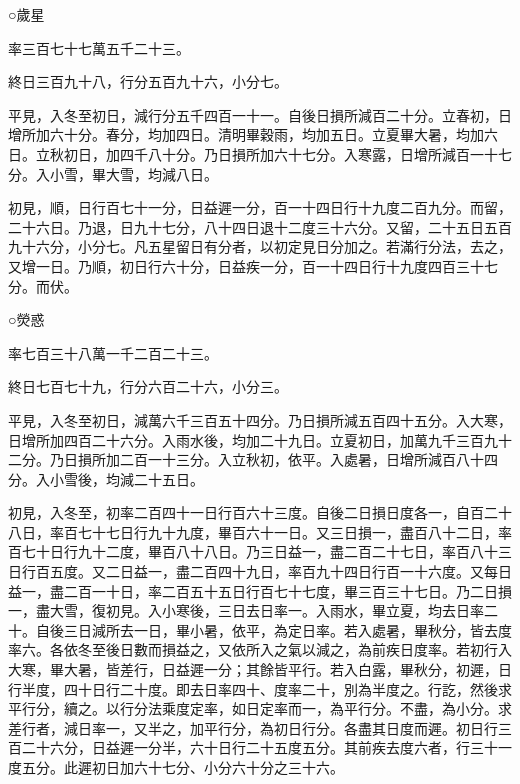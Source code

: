 \begin{pinyinscope}
 ○歲星



 率三百七十七萬五千二十三。



 終日三百九十八，行分五百九十六，小分七。



 平見，入冬至初日，減行分五千四百一十一。自後日損所減百二十分。立春初，日增所加六十分。春分，均加四日。清明畢穀雨，均加五日。立夏畢大暑，均加六日。立秋初日，加四千八十分。乃日損所加六十七分。入寒露，日增所減百一十七分。入小雪，畢大雪，均減八日。



 初見，順，日行百七十一分，日益遲一分，百一十四日行十九度二百九分。而留，二十六日。乃退，日九十七分，八十四日退十二度三十六分。又留，二十五日五百九十六分，小分七。凡五星留日有分者，以初定見日分加之。若滿行分法，去之，又增一日。乃順，初日行六十分，日益疾一分，百一十四日行十九度四百三十七分。而伏。



 ○熒惑



 率七百三十八萬一千二百二十三。



 終日七百七十九，行分六百二十六，小分三。



 平見，入冬至初日，減萬六千三百五十四分。乃日損所減五百四十五分。入大寒，日增所加四百二十六分。入雨水後，均加二十九日。立夏初日，加萬九千三百九十二分。乃日損所加二百一十三分。入立秋初，依平。入處暑，日增所減百八十四分。入小雪後，均減二十五日。



 初見，入冬至，初率二百四十一日行百六十三度。自後二日損日度各一，自百二十八日，率百七十七日行九十九度，畢百六十一日。又三日損一，盡百八十二日，率百七十日行九十二度，畢百八十八日。乃三日益一，盡二百二十七日，率百八十三日行百五度。又二日益一，盡二百四十九日，率百九十四日行百一十六度。又每日益一，盡二百一十日，率二百五十五日行百七十七度，畢三百三十七日。乃二日損一，盡大雪，復初見。入小寒後，三日去日率一。入雨水，畢立夏，均去日率二十。自後三日減所去一日，畢小暑，依平，為定日率。若入處暑，畢秋分，皆去度率六。各依冬至後日數而損益之，又依所入之氣以減之，為前疾日度率。若初行入大寒，畢大暑，皆差行，日益遲一分；其餘皆平行。若入白露，畢秋分，初遲，日行半度，四十日行二十度。即去日率四十、度率二十，別為半度之。行訖，然後求平行分，續之。以行分法乘度定率，如日定率而一，為平行分。不盡，為小分。求差行者，減日率一，又半之，加平行分，為初日行分。各盡其日度而遲。初日行三百二十六分，日益遲一分半，六十日行二十五度五分。其前疾去度六者，行三十一度五分。此遲初日加六十七分、小分六十分之三十六。




\end{pinyinscope}

